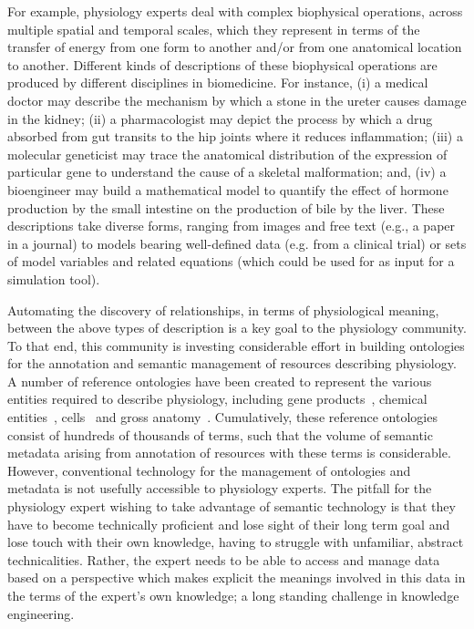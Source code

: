 For example, physiology experts deal with complex biophysical operations, across multiple spatial and temporal scales, which they represent in terms of the transfer of energy from one form to another and/or from one anatomical location to another. Different kinds of descriptions of these biophysical operations are produced by different disciplines in biomedicine. For instance, (i) a medical doctor may describe the mechanism by which a stone in the ureter causes damage in the kidney; (ii) a pharmacologist may depict the process by which a drug absorbed from gut transits to the hip joints where it reduces inflammation; (iii) a molecular geneticist may trace the anatomical distribution of the expression of particular gene to understand the cause of a skeletal malformation; and, (iv) a bioengineer may build a mathematical model to quantify the effect of hormone production by the small intestine on the production of bile by the liver. These descriptions take diverse forms, ranging from images and free text (e.g., a paper in a journal) to models bearing well-defined data (e.g. from a clinical trial) or sets of model variables and related equations (which could be used for as input for a simulation tool).

Automating the discovery of relationships, in terms of physiological meaning, between the above types of description is a key goal to the physiology community. To that end, this community is investing considerable effort in building ontologies for the annotation and semantic management of resources describing physiology. A number of reference ontologies have been created to represent the various entities required to describe physiology, including gene products~\cite{Bla+13}, chemical entities~\cite{HMD+13}, cells~\cite{BRA05} and gross anatomy~\cite{RM03}. Cumulatively, these reference ontologies consist of hundreds of thousands of terms, such that the volume of semantic metadata arising from annotation of resources with these terms is considerable. However, conventional technology for the management of ontologies and metadata is not usefully accessible to physiology experts.
The pitfall for the physiology expert wishing to take advantage of semantic technology is that they have to become technically proficient and lose sight of their long term goal and lose touch with their own knowledge, having to struggle with unfamiliar, abstract technicalities. Rather, the expert needs to be able to access and manage data based on a perspective which makes explicit the meanings involved in this data in the terms of the expert's own knowledge; a long standing challenge in knowledge engineering.

